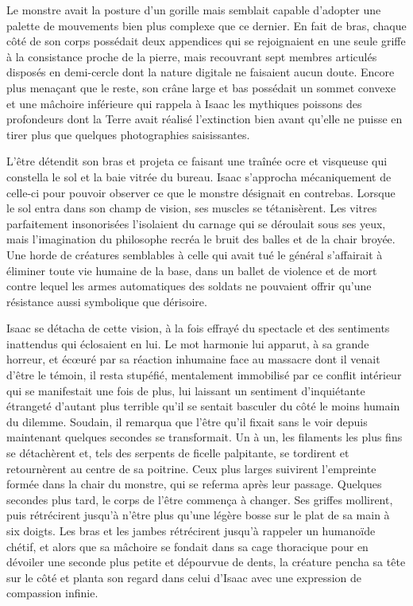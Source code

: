 \documentclass[12pt]{book}
\begin{document}
Le monstre avait la posture d'un gorille mais semblait capable d'adopter une palette de mouvements bien plus complexe que ce dernier. En fait de bras, chaque côté de son corps possédait deux appendices qui se rejoignaient en une seule griffe à la consistance proche de la pierre, mais recouvrant sept membres articulés disposés en demi-cercle dont la nature digitale ne faisaient aucun doute. Encore plus menaçant que le reste, son crâne large et bas possédait un sommet convexe et une mâchoire inférieure qui rappela à Isaac les mythiques poissons des profondeurs dont la Terre avait réalisé l'extinction bien avant qu'elle ne puisse en tirer plus que quelques photographies saisissantes.


L'être détendit son bras et projeta ce faisant une traînée ocre et visqueuse qui constella le sol et la baie vitrée du bureau. Isaac s'approcha mécaniquement de celle-ci pour pouvoir observer ce que le monstre désignait en contrebas. Lorsque le sol entra dans son champ de vision, ses muscles se tétanisèrent. Les vitres parfaitement insonorisées l'isolaient du carnage qui se déroulait sous ses yeux, mais l'imagination du philosophe recréa le bruit des balles et de la chair broyée. Une horde de créatures semblables à celle qui avait tué le général s'affairait à éliminer toute vie humaine de la base, dans un ballet de violence et de mort contre lequel les armes automatiques des soldats ne pouvaient offrir qu'une résistance aussi symbolique que dérisoire.


Isaac se détacha de cette vision, à la fois effrayé du spectacle et des sentiments inattendus qui éclosaient en lui. Le mot harmonie lui apparut, à sa grande horreur, et écœuré par sa réaction inhumaine face au massacre dont il venait d'être le témoin, il resta stupéfié, mentalement immobilisé par ce conflit intérieur qui se manifestait une fois de plus, lui laissant un sentiment d'inquiétante étrangeté d'autant plus terrible qu'il se sentait basculer du côté le moins humain du dilemme. Soudain, il remarqua que l'être qu'il fixait sans le voir depuis maintenant quelques secondes se transformait. Un à un, les filaments les plus fins se détachèrent et, tels des serpents de ficelle palpitante, se tordirent et retournèrent au centre de sa poitrine. Ceux plus larges suivirent l'empreinte formée dans la chair du monstre, qui se referma après leur passage. Quelques secondes plus tard, le corps de l'être commença à changer. Ses griffes mollirent, puis rétrécirent jusqu'à n'être plus qu'une légère bosse sur le plat de sa main à six doigts. Les bras et les jambes rétrécirent jusqu'à rappeler un humanoïde chétif, et alors que sa mâchoire se fondait dans sa cage thoracique pour en dévoiler une seconde plus petite et dépourvue de dents, la créature pencha sa tête sur le côté et planta son regard dans celui d'Isaac avec une expression de compassion infinie.
\end{document}
